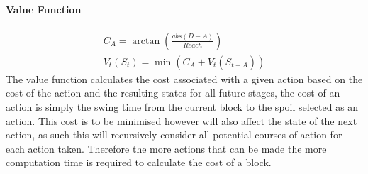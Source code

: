 \paragraph*{Value Function}
\begin{align}
\label{value}
C_A = \arctan(\frac{abs(D-A)}{Reach})\\
V_t(S_t) = \min (C_A+V_t(S_{t+A}))
\end{align}
The value function calculates the cost associated with a given action based on the cost of the action and the resulting states for all future stages, the cost of an action is simply the swing time from the current block to the spoil selected as an action. This cost is to be minimised however will also affect the state of the next action, as such this will recursively consider all potential courses of action for each action taken. Therefore the more actions that can be made the more computation time is required to calculate the cost of a block. 
